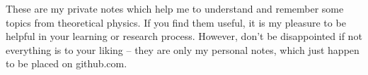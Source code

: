 \documentclass[main.tex]{subfiles}
\begin{document}
   These are my private notes which help me to understand and remember some topics from theoretical physics. If you find them useful, it is my pleasure to be helpful in your learning or research process. However, don't be disappointed if not everything is to your liking -- they are only my personal notes, which just happen to be placed on github.com.
   
\end{document}
